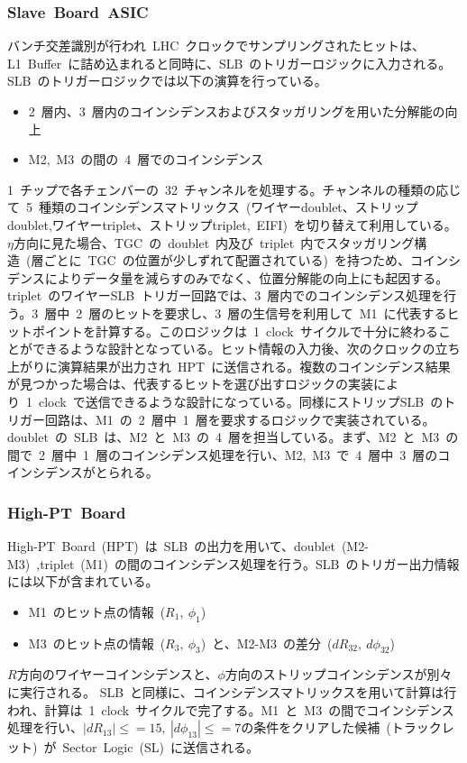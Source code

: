 \subsubsection{Slave~Board~ASIC}
バンチ交差識別が行われ~LHC~クロックでサンプリングされたヒットは、L1~Buffer~に詰め込まれると同時に、SLB~のトリガーロジックに入力される。SLB~のトリガーロジックでは以下の演算を行っている。
\begin{itemize}
\item 2~層内、3~層内のコインシデンスおよびスタッガリングを用いた分解能の向上
\item M2,~M3~の間の~4~層でのコインシデンス
\end{itemize}
1~チップで各チェンバーの~32~チャンネルを処理する。チャンネルの種類の応じて~5~種類のコインシデンスマトリックス~(ワイヤーdoublet、ストリップdoublet,ワイヤーtriplet、ストリップtriplet,~EIFI)~を切り替えて利用している。$\eta$方向に見た場合、TGC~の~doublet~内及び~triplet~内でスタッガリング構造~(層ごとに~TGC~の位置が少しずれて配置されている)~を持つため、コインシデンスによりデータ量を減らすのみでなく、位置分解能の向上にも起因する。
triplet~のワイヤーSLB~トリガー回路では、3~層内でのコインシデンス処理を行う。3~層中~2~層のヒットを要求し、3~層の生信号を利用して~M1~に代表するヒットポイントを計算する。このロジックは~1~clock~サイクルで十分に終わることができるような設計となっている。ヒット情報の入力後、次のクロックの立ち上がりに演算結果が出力され~HPT~に送信される。複数のコインシデンス結果が見つかった場合は、代表するヒットを選び出すロジックの実装により~1~clock~で送信できるような設計になっている。同様にストリップSLB~のトリガー回路は、M1~の~2~層中~1~層を要求するロジックで実装されている。
doublet~の~SLB~は、M2~と~M3~の~4~層を担当している。まず、M2~と~M3~の間で~2~層中~1~層のコインシデンス処理を行い、M2,~M3~で~4~層中~3~層のコインシデンスがとられる。

\subsubsection{High-PT~Board}
High-PT~Board~(HPT)~は~SLB~の出力を用いて、doublet~(M2-M3)~,triplet~(M1)~の間のコインシデンス処理を行う。SLB~のトリガー出力情報には以下が含まれている。
\begin{itemize}
\item M1~のヒット点の情報~($R_1,~\phi_1$)~
\item M3~のヒット点の情報~($R_3,~\phi_3$)~と、M2-M3~の差分~($dR_{32},~d\phi_{32}$)~
\end{itemize}
$R$方向のワイヤーコインシデンスと、$\phi$方向のストリップコインシデンスが別々に実行される。
SLB~と同様に、コインシデンスマトリックスを用いて計算は行われ、計算は~1~clock~サイクルで完了する。M1~と~M3~の間でコインシデンス処理を行い、$|dR_{13}|{\leq}=15,~|d\phi_{13}|{\leq}=7$の条件をクリアした候補~(トラックレット)~が~Sector~Logic~(SL)~に送信される。
